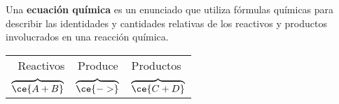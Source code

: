 \begin{warncard}[adjusted title={Ecuación química}]
    Una \textbf{ecuación química} es un enunciado que utiliza fórmulas químicas para describir las identidades y cantidades relativas de los reactivos y productos involucrados en una reacción química.

    \begin{center}
        \begin{tabular}{r c l}
            Reactivos                          & {Produce}                     & Productos                        \\
            {\huge $\overbrace{\ce{ A + B }}$} & {\huge $\overbrace{\ce{->}}$} & {\huge $\overbrace{\ce{C + D}}$}
        \end{tabular}
    \end{center}
\end{warncard}